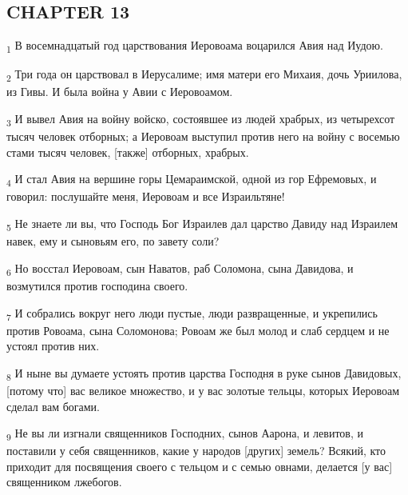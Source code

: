 \subsection{CHAPTER 13}
\begin{tcolorbox}
\textsubscript{1} В восемнадцатый год царствования Иеровоама воцарился Авия над Иудою.
\end{tcolorbox}
\begin{tcolorbox}
\textsubscript{2} Три года он царствовал в Иерусалиме; имя матери его Михаия, дочь Уриилова, из Гивы. И была война у Авии с Иеровоамом.
\end{tcolorbox}
\begin{tcolorbox}
\textsubscript{3} И вывел Авия на войну войско, состоявшее из людей храбрых, из четырехсот тысяч человек отборных; а Иеровоам выступил против него на войну с восемью стами тысяч человек, [также] отборных, храбрых.
\end{tcolorbox}
\begin{tcolorbox}
\textsubscript{4} И стал Авия на вершине горы Цемараимской, одной из гор Ефремовых, и говорил: послушайте меня, Иеровоам и все Израильтяне!
\end{tcolorbox}
\begin{tcolorbox}
\textsubscript{5} Не знаете ли вы, что Господь Бог Израилев дал царство Давиду над Израилем навек, ему и сыновьям его, по завету соли?
\end{tcolorbox}
\begin{tcolorbox}
\textsubscript{6} Но восстал Иеровоам, сын Наватов, раб Соломона, сына Давидова, и возмутился против господина своего.
\end{tcolorbox}
\begin{tcolorbox}
\textsubscript{7} И собрались вокруг него люди пустые, люди развращенные, и укрепились против Ровоама, сына Соломонова; Ровоам же был молод и слаб сердцем и не устоял против них.
\end{tcolorbox}
\begin{tcolorbox}
\textsubscript{8} И ныне вы думаете устоять против царства Господня в руке сынов Давидовых, [потому что] вас великое множество, и у вас золотые тельцы, которых Иеровоам сделал вам богами.
\end{tcolorbox}
\begin{tcolorbox}
\textsubscript{9} Не вы ли изгнали священников Господних, сынов Аарона, и левитов, и поставили у себя священников, какие у народов [других] земель? Всякий, кто приходит для посвящения своего с тельцом и с семью овнами, делается [у вас] священником лжебогов.
\end{tcolorbox}
